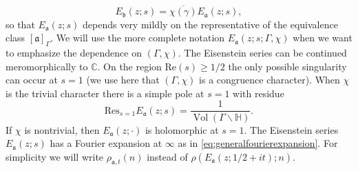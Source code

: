 \documentclass{article}
\theoremstyle{named}
\newcommand{\CC}{\mathbb{C}}
\newcommand{\Hyp}{\mathbb{H}}
\renewcommand{\a}{\mathfrak{a}}
\renewcommand{\b}{\mathfrak{b}}
\DeclareMathOperator{\vol}{Vol}
\begin{document}
\begin{equation}\label{eq:transformationdifferentrepresentativeeisenstein}
    E_\b(z;s) = \overline{\chi(\gamma)}E_\a(z; s),
\end{equation}
so that $E_\a(z;s)$ depends very mildly on the representative of the equivalence class $[\a]_\Gamma$. We will use the more complete notation $E_\a(z; s; \Gamma, \chi)$ when we want to emphasize the dependence on $(\Gamma, \chi)$. The Eisenstein series can be continued meromorphically to $\CC$. On the region $\text{Re}(s) \geq 1/2$ the only possible singularity can occur at $s = 1$ (we use here that $(\Gamma, \chi)$ is a congruence character). When $\chi$ is the trivial character there is a simple pole at $s = 1$ with residue
\begin{equation*}
    \text{Res}_{s = 1}E_\a(z; s) = \frac{1}{\vol(\Gamma \backslash \Hyp)}.
\end{equation*}
If $\chi$ is nontrivial, then $E_\a(z; \cdot)$ is holomorphic at $s = 1$. The Eisenstein series $E_\a(z; s)$ has a Fourier expansion at $\infty$ as in \eqref{eq:generalfourierexpansion}. For simplicity we will write $\rho_{\a, t}(n)$ instead of $\rho(E_\a(z; 1/2 + it); n)$.
\end{document}

